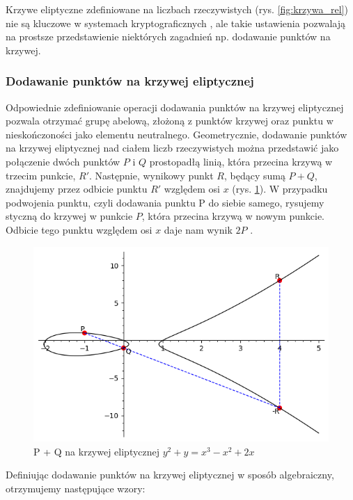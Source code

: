 Krzywe eliptyczne zdefiniowane na liczbach rzeczywistych (rys. \ref{fig:krzywa_rel}) nie są kluczowe w
systemach kryptograficznych \cite*{Stinson2021}, ale takie ustawienia
pozwalają na prostsze przedstawienie niektórych zagadnień
np. dodawanie punktów na krzywej.


\subsubsection{Dodawanie punktów na krzywej eliptycznej}
Odpowiednie zdefiniowanie operacji dodawania punktów na krzywej eliptycznej
pozwala otrzymać grupę abelową, złożoną z punktów krzywej oraz punktu w nieskończoności jako
elementu neutralnego.
\newline
\indent
Geometrycznie, dodawanie punktów na krzywej eliptycznej nad ciałem liczb rzeczywistych można przedstawić
jako połączenie dwóch punktów $P$ i $Q$ prostopadłą linią, która przecina krzywą w trzecim
punkcie, $R'$. Następnie, wynikowy punkt $R$, będący sumą $P+Q$, znajdujemy przez
odbicie punktu $R'$ względem osi $x$ (rys. \ref{fig:krzywa_add}). W przypadku podwojenia punktu, czyli dodawania
punktu P do siebie samego, rysujemy styczną do krzywej w punkcie $P$, która przecina
krzywą w nowym punkcie. Odbicie tego punktu względem osi $x$ daje nam wynik $2P$ \cite{Algorytmy}\cite{Stinson2021}.
\begin{figure}[!h]
    \centering \includegraphics[width=0.8\linewidth]{sage/elliptic_rational_point_addition.png}
    \caption{P + Q na krzywej eliptycznej $y^2+y=x^3-x^2+2x$}
    \label{fig:krzywa_add}
\end{figure}
\par
Definiując dodawanie punktów na krzywej eliptycznej w sposób algebraiczny, otrzymujemy następujące wzory:
